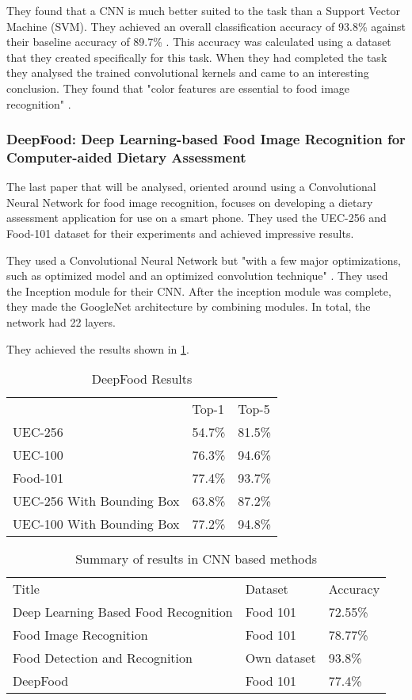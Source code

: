 They found that a CNN is much better suited to the task than a Support Vector
Machine (SVM). They achieved an overall classification accuracy of 93.8\%
against their baseline accuracy of 89.7\% \textcite{kagayaFood}. This accuracy
was calculated using a dataset that they created specifically for this task.
When they had completed the task they analysed the trained convolutional kernels
and came to an interesting conclusion. They found that "color features are
essential to food image recognition" \textcite{kagayaFood}.

\subsubsection*{DeepFood: Deep Learning-based Food Image Recognition for
Computer-aided Dietary Assessment}
The last paper that will be analysed, oriented around using a Convolutional Neural
Network for food image recognition, focuses on developing a dietary assessment
application for use on a smart phone. They used the UEC-256 and Food-101 dataset
for their experiments and achieved impressive results.

They used a Convolutional Neural Network but "with a few major optimizations,
such as optimized model and an optimized convolution technique"
\textcite{deepFood}. They used the Inception module for their CNN. After the
inception module was complete, they made the GoogleNet architecture by combining modules. In
total, the network had 22 layers.

They achieved the results shown in \ref{resultsDeepFood}.

\begin{table}[]
	\centering
	\caption{DeepFood Results}
	\label{resultsDeepFood}
	\begin{tabular}{lll}
		& Top-1  & Top-5  \\
		UEC-256                   & 54.7\% & 81.5\% \\
		UEC-100                   & 76.3\% & 94.6\% \\
		Food-101                  & 77.4\% & 93.7\% \\
		UEC-256 With Bounding Box & 63.8\% & 87.2\% \\
		  UEC-100 With Bounding Box & 77.2\% & 94.8\%
	\end{tabular}
\end{table}

\begin{table}[]
	\centering
	\caption{Summary of results in CNN based methods}
	\label{cnn_summary}
	\begin{tabular}{lll}
		Title                                & Dataset     & Accuracy \\
		Deep Learning Based Food Recognition & Food 101    & 72.55\%  \\
		Food Image Recognition               & Food 101    & 78.77\%  \\
		Food Detection and Recognition       & Own dataset & 93.8\%   \\
		DeepFood                             & Food 101    & 77.4\%  
	\end{tabular}
\end{table}

